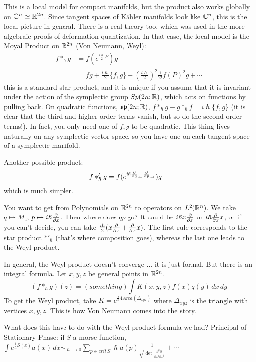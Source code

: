  This is a local model for compact manifolds, but the product also works globally on
 $\mathbb{C}^n\simeq \mathbb{R}^{2n}$.  Since tangent spaces of K\"ahler manifolds look like
 $\mathbb{C}^n$, this is the local picture in general.  There is a real theory too, which was
 used in the more algebraic proofs of deformation quantization.  In that case, the
 local model is the Moyal Product on $\mathbb{R}^{2n}$ (Von Neumann, Weyl):
 \begin{align*}
    f\ast_\hslash g  &= f(e^{\frac{i\hslash}{2}P})g\\
     &= fg + \frac{i\hslash}{2} \{f,g\} + (\frac{i\hslash}{2})^2\frac{1}{2!} f(P)^2g +
     \cdots
 \end{align*}
 this is a standard star product, and it is unique if you assume that it is invariant
 under the action of the symplectic group $Sp(2n;\mathbb{R})$, which acts on functions by
 pulling back.  On quadratic functions, $\mathfrak{sp}(2n;\mathbb{R})$, $f\ast_\hslash g -
 g\ast_\hslash f = i\hslash\{f,g\}$ (it is clear that the third and higher order terms
 vanish, but so do the second order terms!).  In fact, you only need one of $f,g$ to
 be quadratic.  This thing lives naturally on any symplectic vector space, so you have
 one on each tangent space of a symplectic manifold.

 Another possible product:
 \begin{align*}
   f\ast'_\hslash g &= f(e^{i\hslash \frac{\partial }{\partial q}_{\leftarrow} \frac{\partial }{\partial p}_\to})g
 \end{align*}
 which is much simpler.

 You want to get from Polynomials on $\mathbb{R}^{2n}$ to operators on $L^2(\mathbb{R}^n)$.  We take
 $q\mapsto M_z$, $p\mapsto i\hslash \frac{\partial }{\partial x}$.  Then where does $qp$ go?  It could
 be $i\hslash x \frac{\partial }{\partial x}$ or $i\hslash \frac{\partial }{\partial x} x$, or if you can't decide, you
 can take $\frac{i\hslash}{2}(x\frac{\partial }{\partial x}+\frac{\partial }{\partial x}x)$.  The first rule corresponds
 to the star product $\ast'_\hslash$ (that's where composition goes), whereas the last
 one leads to the Weyl product.

 In general, the Weyl product doesn't converge ... it is just formal.  But there is an
 integral formula.  Let $x,y,z$ be general points in $\mathbb{R}^{2n}$.
 \[
    (f\ast_\hslash g)(z) = (something) \int K(x,y,z) f(x)g(y)\, dx\, dy
 \]
 To get the Weyl product, take $K = e^{\frac{i}{\hslash} 4Area(\Delta_{xyz})}$ where
 $\Delta_{xyz}$ is the triangle with vertices $x,y,z$.  This is how Von Neumann comes into
 the story.

 What does this have to do with the Weyl product formula we had?  Principal of
 Stationary Phase: if $S$ a morse function,  $\int e^{\frac{i}{\hslash} S(x)}a(x)\, dx
 \sim_{\hslash\to 0} \sum_{p\in crit\, S} \hslash a(p)\frac{1}{\sqrt{\det
 \frac{\partial^2 S}{\partial x^i \partial x^j}}}+\cdots$
